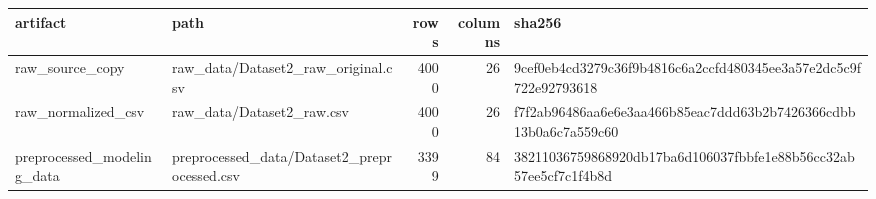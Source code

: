 \begin{tabular}{llrrl}
\toprule
artifact & path & rows & columns & sha256 \\
\midrule
raw\_source\_copy & raw\_data/Dataset2\_raw\_original.csv & 4000 & 26 & 9cef0eb4cd3279c36f9b4816c6a2ccfd480345ee3a57e2dc5c9f722e92793618 \\
raw\_normalized\_csv & raw\_data/Dataset2\_raw.csv & 4000 & 26 & f7f2ab96486aa6e6e3aa466b85eac7ddd63b2b7426366cdbb13b0a6c7a559c60 \\
preprocessed\_modeling\_data & preprocessed\_data/Dataset2\_preprocessed.csv & 3399 & 84 & 38211036759868920db17ba6d106037fbbfe1e88b56cc32ab57ee5cf7c1f4b8d \\
\bottomrule
\end{tabular}
